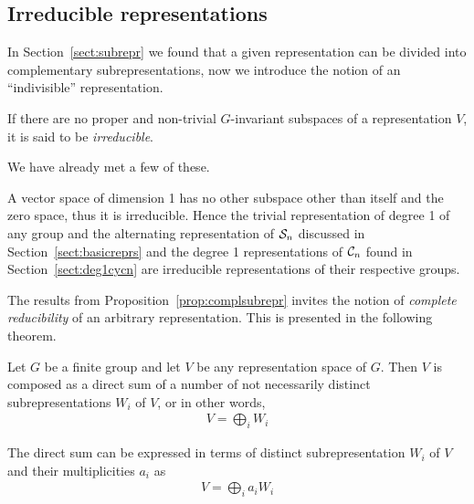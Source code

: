 \subsection{Irreducible representations}

In Section~\ref{sect:subrepr} we found that a given representation can be divided into complementary subrepresentations, now we introduce the notion of an ``indivisible'' representation.

\begin{definition}
	If there are no proper and non-trivial $G$-invariant subspaces of a representation $V$, it is said to be \textit{irreducible}. 
\end{definition}

We have already met a few of these.

\begin{example}\cite[Example 1.4.2.]{Sagan}
	A vector space of dimension 1 has no other subspace other than itself and the zero space, thus it is irreducible. Hence the trivial representation of degree 1 of any group and the alternating representation of $\mathcal{S}_n$ discussed in Section~\ref{sect:basicreprs} and the degree 1 representations of $\mathcal{C}_n$ found in Section~\ref{sect:deg1cycn} are irreducible representations of their respective groups.
\end{example}

The results from Proposition~\ref{prop:complsubrepr} invites the notion of \textit{complete reducibility} of an arbitrary representation. This is presented in the following theorem.

\begin{theorem}\label{thm:maschkes}
	Let $G$ be a finite group and let $V$ be any representation space of $G$. Then $V$ is composed as a direct sum of a number of not necessarily distinct subrepresentations $W_i$ of $V$, or in other words,
	\begin{align*}
		V = \bigoplus_i W_i
	\end{align*}
	\begin{note}
		The direct sum can be expressed in terms of distinct subrepresentation $W_i$ of $V$ and their multiplicities $a_i$ as
		\begin{align*}
			V = \bigoplus_i a_i W_i
		\end{align*}
	\end{note}
\end{theorem}

